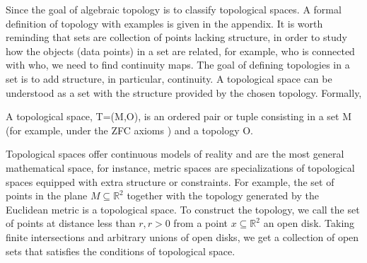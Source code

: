 \documentclass[onecollarge,runningheads]{svjour2}
\begin{document}
Since the goal of algebraic topology is to classify topological spaces. A formal definition of topology with examples is given in the appendix. It is worth reminding that sets are collection of points lacking structure, in order to study how the objects (data points) in a set are related, for example, who is connected with who, we need to find continuity maps. The goal of defining topologies in a set is to add structure, in particular, continuity.
A topological space can be understood as a set with the structure provided by the chosen topology. Formally,  

\begin{definition}
A topological space, T=(M,O), is an ordered pair or tuple consisting in a set M (for example, under the ZFC axioms \cite{suppes1960axiomatic}) and a topology O. %
 \end{definition}

Topological spaces offer continuous models of reality and are the most general mathematical space, for instance, metric spaces are specializations of topological spaces equipped with extra structure or constraints.
For example, the set of points in the plane $M \subseteq \mathbb{R}^2$ together with the topology generated by the Euclidean metric is a topological space. To construct the topology, we call the set of points at distance less than $r, r > 0$ from a point $x \subseteq \mathbb{R}^2$ an open disk. Taking finite intersections and arbitrary unions of open disks, we get a collection of open sets that satisfies the conditions of topological space.

\end{document}
